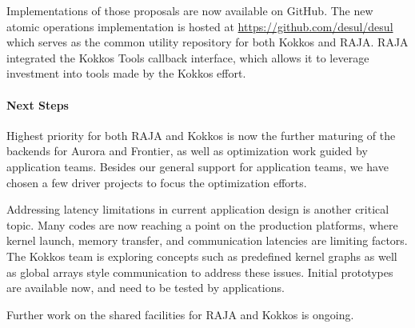 Implementations of those proposals are now available on GitHub. 
The new atomic operations implementation is hosted at \url{https://github.com/desul/desul} which serves as the common utility repository for both Kokkos and RAJA.
RAJA integrated the Kokkos Tools callback interface, which allows it to leverage investment into tools made by the Kokkos effort.

\paragraph{Next Steps}

Highest priority for both RAJA and Kokkos is now the further maturing of the backends for Aurora and Frontier, as well as optimization work guided by application teams.
Besides our general support for application teams, we have chosen a few driver projects to focus the optimization efforts.

Addressing latency limitations in current application design is another critical topic.
Many codes are now reaching a point on the production platforms, where kernel launch, memory transfer, and communication latencies are limiting factors.
The Kokkos team is exploring concepts such as predefined kernel graphs as well as global arrays style communication to address these issues.
Initial prototypes are available now, and need to be tested by applications.

Further work on the shared facilities for RAJA and Kokkos is ongoing.

